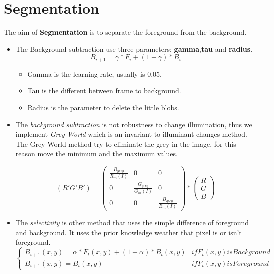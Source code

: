 \section{Segmentation}
The aim of \textbf{Segmentation} is to separate the foreground from the background.

\begin{itemize}
\item The Background subtraction use three parameters: \textbf{gamma},\textbf{tau} and \textbf{radius}.
	\begin{equation} B_{i+1} = \gamma * F_{i} + (1-\gamma)*B_{i} \end{equation}
	\begin{itemize}
	\item Gamma is the learning rate, usually is 0,05.
	\item Tau is the different between frame to background.
	\item Radius is the parameter to delete the little blobs.
	\end{itemize}
	
\item The \textit{background subtraction} is not robustness to change illumination, thus we implement \textit{Grey-World} which is an invariant to illuminant changes method. 
The Grey-World method try to eliminate the grey in the image, for this reason move the minimum and the maximum values.

\begin{equation}
	( R' G' B' )= \left(
	\begin{array}{cccl}
		\frac{R_{grey}}{R_{m}(I)} & 0 & 0 \\
		0 & \frac{G_{grey}}{G_{m}(I)} & 0 \\
 		0 & 0 & \frac{B_{grey}}{B_{m}(I)}
	\end{array}
	\right) 
	* 
	\left(
	\begin{array}{c} R \\ G \\ B
	\end{array}
	\right)
\end{equation} 

\item The \textit{selectivity} is other method that uses the simple difference of foreground and background. It uses the prior knowledge weather that pixel is or isn't foreground. 
	\begin{equation}
	\left \{
	\begin{array}{cccl}
		B_{i+1}(x,y) = \alpha * F_{t}(x,y)+(1-\alpha )* B_{t}(x,y) & if F_{t}(x,y) is Background \\
		B_{i+1}(x,y) = B_{t}(x,y) & if F_{t}(x,y) is Foreground
	\end{array} \right.
	\end{equation}



\end{itemize}
